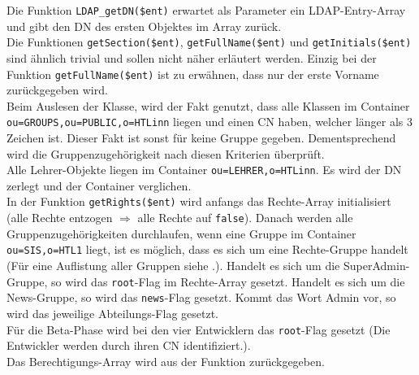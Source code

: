 
Die Funktion \texttt{LDAP\_getDN(\$ent)} erwartet als Parameter ein LDAP-Entry-Array und gibt den DN des ersten Objektes im Array zurück.\\
Die Funktionen \texttt{getSection(\$ent)}, \texttt{getFullName(\$ent)} und \texttt{getInitials(\$ent)} sind ähnlich trivial und sollen nicht näher erläutert werden. Einzig bei der Funktion \texttt{getFullName(\$ent)} ist zu erwähnen, dass nur der erste Vorname zurückgegeben wird.\\


Beim Auslesen der Klasse, wird der Fakt genutzt, dass alle Klassen im Container \texttt{ou=GROUPS,ou=PUBLIC,o=HTLinn} liegen und einen CN haben, welcher länger als 3 Zeichen ist. Dieser Fakt ist sonst für keine Gruppe gegeben. Dementsprechend wird die Gruppenzugehörigkeit nach diesen Kriterien überprüft.\\


Alle Lehrer-Objekte liegen im Container \texttt{ou=LEHRER,o=HTLinn}. Es wird der DN zerlegt und der Container verglichen.\\


In der Funktion \texttt{getRights(\$ent)} wird anfangs das Rechte-Array initialisiert (alle Rechte entzogen $ \Longrightarrow $ alle Rechte auf \texttt{false}). Danach werden alle Gruppenzugehörigkeiten durchlaufen, wenn eine Gruppe im Container \texttt{ou=SIS,o=HTL1} liegt, ist es möglich, dass es sich um eine Rechte-Gruppe handelt (Für eine Auflistung aller Gruppen siehe .). Handelt es sich um die SuperAdmin-Gruppe, so wird das \texttt{root}-Flag im Rechte-Array gesetzt. Handelt es sich um die News-Gruppe, so wird das \texttt{news}-Flag gesetzt. Kommt das Wort Admin vor, so wird das jeweilige Abteilungs-Flag gesetzt.\\
Für die Beta-Phase wird bei den vier Entwicklern das \texttt{root}-Flag gesetzt (Die Entwickler werden durch ihren CN identifiziert.).\\
Das Berechtigungs-Array wird aus der Funktion zurückgegeben.\\

